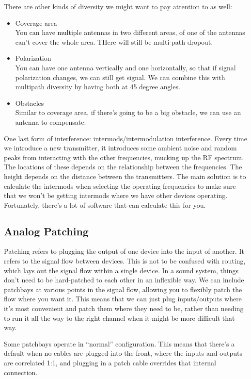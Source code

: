 \documentclass[a4paper]{article}
\begin{document}
There are other kinds of diversity we might want to pay attention to as well:
\begin{itemize}
	\item Coverage area\\
		You can have multiple antennas in two different areas, of one
		of the antennas can't cover the whole area. THere will still be
		multi-path dropout.
	\item  Polarization\\
		You can have one antenna vertically and one horizontally, so
		that if signal polarization changes, we can still get signal.
		We can combine this with multipath diversity by having both at
		45 degree angles.
	\item Obstacles\\
		Similar to coverage area, if there's going to be a big
		obstacle, we can use an antenna to compensate.
\end{itemize}

One last form of interference: intermods/intermodulation interference. Every
time we introduce a new transmitter, it introduces some ambient noise and
random peaks from interacting with the other frequencies, mucking up the RF
spectrum. The locations of these depends on the relationship between the
frequencies. The height depends on the distance between the transmitters. The
main solution is to calculate the intermods when selecting the operating
frequencies to make sure that we won't be getting intermods where we have other
devices operating. Fortunately, there's a lot of software that can calculate
this for you.

\subsection{Analog Patching}
Patching refers to plugging the output of one device into the input of another.
It refers to the signal flow between devices.
This is not to be confused with routing, which lays out the signal flow within
a single device. In a sound system, things don't need to be hard-patched to
each other in an inflexible way. We can include patchbays at various points in
the signal flow, allowing you to flexibly patch the flow where you want it.
This means that we can just plug inputs/outputs where it's most convenient and
patch them where they need to be, rather than needing to run it all the way to
the right channel when it might be more difficult that way.

Some patchbays operate in ``normal'' configuration. This means that there's a
default when no cables are plugged into the front, where the inputs and outputs
are correlated 1:1, and plugging in a patch cable overrides that internal
connection.
\end{document}
